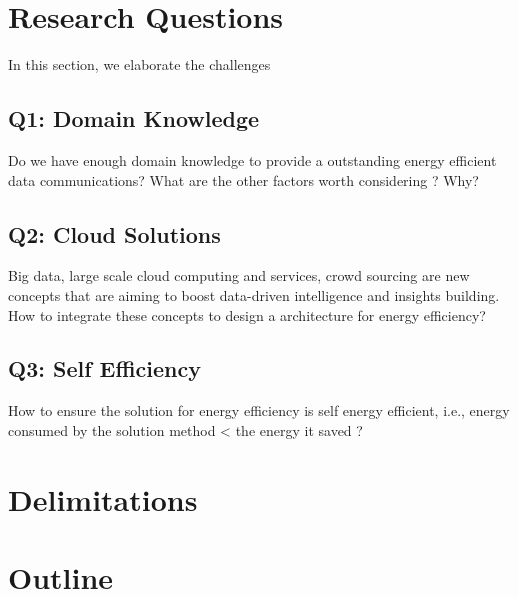 \section{Research Questions}
\label{section:rq}
In this section, we elaborate the challenges 

\subsection{Q1: Domain Knowledge} 
Do we have enough domain knowledge to provide a outstanding energy efficient data communications? What are the other factors worth considering ? Why?

\subsection{Q2: Cloud Solutions}
Big data, large scale cloud computing and services, crowd sourcing are new concepts that are aiming to boost data-driven intelligence and insights building. How to integrate these concepts to design a architecture for energy efficiency?

\subsection{Q3: Self Efficiency}
How to ensure the solution for energy efficiency is self energy efficient, i.e., energy consumed by the solution method < the energy it saved ?


\section{Delimitations}
\label{section:dlimit}
\section{Outline}
\label{section:outln}



